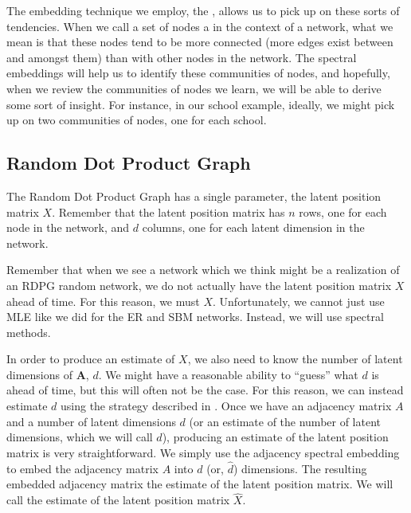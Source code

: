 \documentclass[letterpaper,10pt,english]{jupyterBook}
\begin{document}
\sphinxAtStartPar
The embedding technique we employ, the , allows us to pick up on these  sorts of tendencies. When we call a set of nodes a  in the context of a network, what we mean is that these nodes tend to be more connected (more edges exist between and amongst them) than with other nodes in the network. The spectral embeddings will help us to identify these communities of nodes, and hopefully, when we review the communities of nodes we learn, we will be able to derive some sort of insight. For instance, in our school example, ideally, we might pick up on two communities of nodes, one for each school.


\subsection{Random Dot Product Graph}
\label{\detokenize{representations/ch6/estimating-parameters_spectral:random-dot-product-graph}}
\sphinxAtStartPar
The Random Dot Product Graph has a single parameter, the latent position matrix \(X\). Remember that the latent position matrix has \(n\) rows, one for each node in the network, and \(d\) columns, one for each latent dimension in the network.

\sphinxAtStartPar
Remember that when we see a network which we think might be a realization of an RDPG random network, we do not actually have the latent position matrix \(X\) ahead of time. For this reason, we must  \(X\). Unfortunately, we cannot just use MLE like we did for the ER and SBM networks. Instead, we will use spectral methods.

\sphinxAtStartPar
In order to produce an estimate of \(X\), we also need to know the number of latent dimensions of \(\pmb A\), \(d\). We might have a reasonable ability to “guess” what \(d\) is ahead of time, but this will often not be the case. For this reason, we can instead estimate \(d\) using the strategy described in . Once we have an adjacency matrix \(A\) and a number of latent dimensions \(d\) (or an estimate of the number of latent dimensions, which we will call \(\hat d\)), producing an estimate of the latent position matrix is very straightforward. We simply use the adjacency spectral embedding to embed the adjacency matrix \(A\) into \(d\) (or, \(\hat d\)) dimensions. The resulting embedded adjacency matrix  the estimate of the latent position matrix. We will call the estimate of the latent position matrix \(\hat X\).
\end{document}
